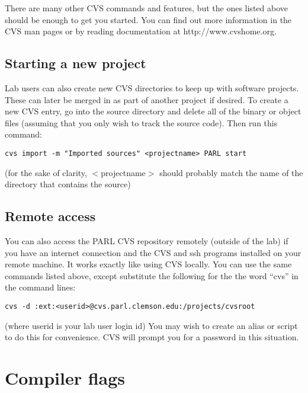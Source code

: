 \documentclass[11pt, letterpaper]{article}
\begin{document}
There are many other CVS commands and features, but the ones listed
above should be enough to get you started.  You can find out more
information in the CVS man pages or by reading documentation at
http://www.cvshome.org.

\subsection{Starting a new project}

Lab users can also create new CVS directories to keep up with 
software projects.  These can later be merged in as part of another
project if desired.  To create a new CVS entry, go into the source
directory and delete all of the binary or object files (assuming that
you only wish to track the source code).  Then run this command:

\begin{verbatim}
cvs import -m "Imported sources" <projectname> PARL start
\end{verbatim}

(for the sake of clarity, $<$projectname$>$ should probably match the name of the directory that
contains the source)  

\subsection{Remote access}

You can also access the PARL CVS repository remotely (outside of the
lab) if you have an internet connection and the CVS and ssh programs
installed on your remote machine.  It works exactly like using CVS
locally.  You can use the same commands listed above, except substitute
the following for the the word ``cvs'' in the command lines:

\begin{verbatim}
cvs -d :ext:<userid>@cvs.parl.clemson.edu:/projects/cvsroot
\end{verbatim}

(where userid is your lab user login id)  You may wish to create an
alias or script to do this for convenience.  CVS will prompt you for a
password in this situation.



\section{Compiler flags}
\label{sec:gcc}
\end{document}
